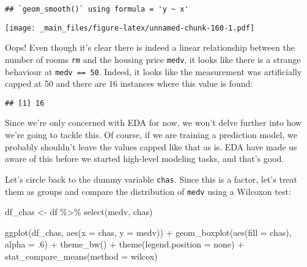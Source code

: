 \documentclass[
]{book}
\newenvironment{Shaded}{\begin{snugshade}}{\end{snugshade}}
\newcommand{\AttributeTok}[1]{\textcolor[rgb]{0.77,0.63,0.00}{#1}}
\newcommand{\DecValTok}[1]{\textcolor[rgb]{0.00,0.00,0.81}{#1}}
\newcommand{\FunctionTok}[1]{\textcolor[rgb]{0.00,0.00,0.00}{#1}}
\newcommand{\NormalTok}[1]{#1}
\newcommand{\OtherTok}[1]{\textcolor[rgb]{0.56,0.35,0.01}{#1}}
\newcommand{\SpecialCharTok}[1]{\textcolor[rgb]{0.00,0.00,0.00}{#1}}
\newcommand{\StringTok}[1]{\textcolor[rgb]{0.31,0.60,0.02}{#1}}
\begin{document}
\begin{verbatim}
## `geom_smooth()` using formula = 'y ~ x'
\end{verbatim}

\texttt{[image: \_main\_files/figure-latex/unnamed-chunk-160-1.pdf]}

Oops! Even though it's clear there is indeed a linear relationship between the number of rooms \texttt{rm} and the housing price \texttt{medv}, it looks like there is a strange behaviour at \texttt{medv\ ==\ 50}. Indeed, it looks like the measurement was artificially capped at 50 and there are 16 instances where this value is found:

\begin{Shaded}
\end{Shaded}

\begin{verbatim}
## [1] 16
\end{verbatim}

Since we're only concerned with EDA for now, we won't delve further into how we're going to tackle this. Of course, if we are training a prediction model, we probably shouldn't leave the values capped like that as is. EDA have made us aware of this before we started high-level modeling tasks, and that's good.

Let's circle back to the dummy variable \texttt{chas}. Since this is a factor, let's treat them as groups and compare the distribution of \texttt{medv} using a Wilcoxon test:

\begin{Shaded}
\begin{Highlighting}[]
\NormalTok{df\_chas }\OtherTok{\textless{}{-}}\NormalTok{ df }\SpecialCharTok{\%\textgreater{}\%} \FunctionTok{select}\NormalTok{(medv, chas)}

\FunctionTok{ggplot}\NormalTok{(df\_chas, }\FunctionTok{aes}\NormalTok{(}\AttributeTok{x =}\NormalTok{ chas, }\AttributeTok{y =}\NormalTok{ medv)) }\SpecialCharTok{+}
  \FunctionTok{geom\_boxplot}\NormalTok{(}\FunctionTok{aes}\NormalTok{(}\AttributeTok{fill =}\NormalTok{ chas), }\AttributeTok{alpha =}\NormalTok{ .}\DecValTok{6}\NormalTok{) }\SpecialCharTok{+} 
  \FunctionTok{theme\_bw}\NormalTok{() }\SpecialCharTok{+} \FunctionTok{theme}\NormalTok{(}\AttributeTok{legend.position =} \StringTok{\textquotesingle{}none\textquotesingle{}}\NormalTok{) }\SpecialCharTok{+}
  \FunctionTok{stat\_compare\_means}\NormalTok{(}\AttributeTok{method =} \StringTok{\textquotesingle{}wilcox\textquotesingle{}}\NormalTok{)}
\end{Highlighting}
\end{Shaded}
\end{document}
